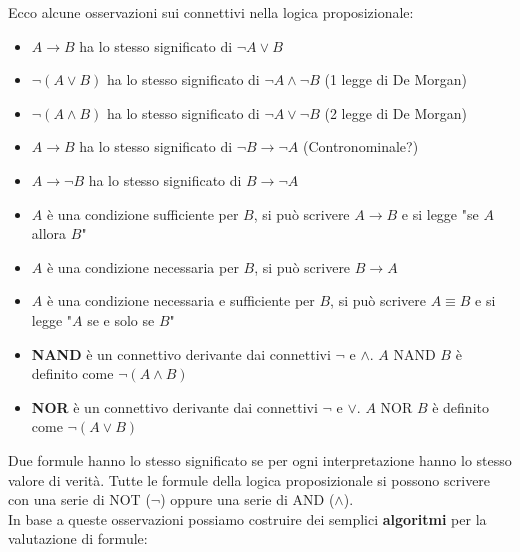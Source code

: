\newpage 
\noindent Ecco alcune osservazioni sui connettivi nella logica proposizionale:
\begin{itemize}
    \item $A \to B$ ha lo stesso significato di $\neg A \vee B$
    \item $\neg (A\vee B)$ ha lo stesso significato di $\neg A \wedge \neg B$ (1 legge di De Morgan)
    \item $\neg (A \wedge B)$ ha lo stesso significato di $\neg A \vee \neg B$ (2 legge di De Morgan)
    \item $A \to B$ ha lo stesso significato di $\neg B \to \neg A$ (Contronominale?)
    \item $A \to \neg B$ ha lo stesso significato di $B \to \neg A$
    \item $A$ è una condizione sufficiente per $B$, si può scrivere $A \to B$ e si legge "se $A$ allora $B$"
    \item $A$ è una condizione necessaria per $B$, si può scrivere $B \to A$
    \item $A$ è una condizione necessaria e sufficiente per $B$, si può scrivere $A \equiv B$ e si legge "$A$ se e solo se $B$"
    \item \textbf{NAND} è un connettivo derivante dai connettivi $\neg$ e $\wedge$. $A$ NAND $B$ è definito come $\neg(A \wedge B)$
    \item \textbf{NOR} è un connettivo derivante dai connettivi $\neg $ e $\vee$. $A$ NOR $B$ è definito come $\neg(A \vee B)$ 
\end{itemize}
Due formule hanno lo stesso significato se per ogni interpretazione hanno lo stesso valore di verità. Tutte le formule 
della logica proposizionale si possono scrivere con una serie di NOT ($\neg$) oppure una serie di AND ($\wedge$).\smallskip\\
In base a queste osservazioni possiamo costruire dei semplici \textbf{algoritmi} per la valutazione di formule:
